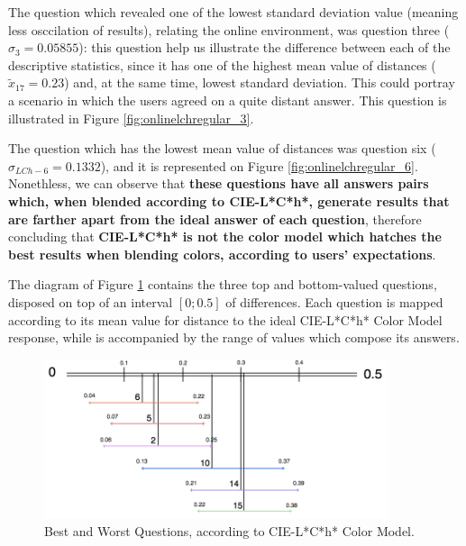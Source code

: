 %
The question which revealed one of the lowest standard deviation value (meaning less osccilation of results), relating the online environment, was question three ($\sigma_{3} = 0.05855$): this question help us
illustrate the difference between each of the descriptive statistics, since it has one of the highest mean value of distances ($\tilde{x}_{17} = 0.23$) and, at the same time, lowest standard deviation. This could
portray a scenario in which the users agreed on a quite distant answer. This question is illustrated in Figure \ref{fig:onlinelchregular_3}. \par
%
The question which has the lowest mean value of distances was question six ($\sigma_{LCh-6} = 0.1332$), and it is represented on Figure \ref{fig:onlinelchregular_6}. Nonethless, we can observe that \textbf{these
questions have all answers pairs which, when blended according to CIE-L*C*h*, generate results that are farther apart from the ideal answer of each question}, therefore concluding that \textbf{CIE-L*C*h* is not
the color model which hatches the best results when blending colors, according to users' expectations}. \par
%
The diagram of Figure \ref{fig:lch_analysis} contains the three top and bottom-valued questions, disposed on top of an interval $[0 ; 0.5]$ of differences. Each question is mapped according to its mean value for
distance to the ideal CIE-L*C*h* Color Model response, while is accompanied by the range of values which compose its answers. \par
%
\begin{figure}[!htbp]
  \centering
  \includegraphics[width=0.9\textwidth]{images/lch_questions_analysis.png}
  \caption[Best and Worst Questions, according to CIE-L*C*h* Color Model.]{Best and Worst Questions, according to CIE-L*C*h* Color Model.}
  \label{fig:lch_analysis}
\end{figure}
%
%
